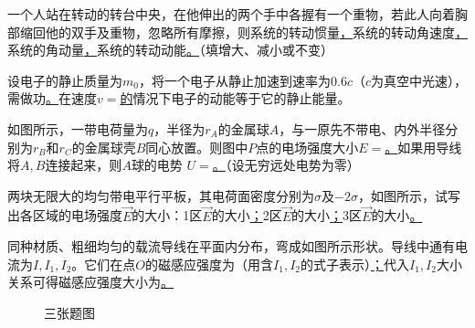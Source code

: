 一个人站在转动的转台中央，在他伸出的两个手中各握有一个重物，若此人向着胸部缩回他的双手及重物，忽略所有摩擦，则系统的转动惯量\ul，系统的转动角速度\ul，系统的角动量\ul ，系统的转动动能\ul。（填增大、减小或不变）

设电子的静止质量为$m_0$，将一个电子从静止加速到速率为$0.6c$（$c$为真空中光速），需做功\ul。在速度$v=$\ul 的情况下电子的动能等于它的静止能量。

如图所示，一带电荷量为$q$，半径为$r_A$的金属球$A$，与一原先不带电、内外半径分别为$r_B$和$r_C$的金属球壳$B$同心放置。则图中$P$点的电场强度大小$E=$\ul。如果用导线将$A,B$连接起来，则$A$球的电势 $U=$\ul。（设无穷远处电势为零）

两块无限大的均匀带电平行平板，其电荷面密度分别为$\sigma$及$-2\sigma$，如图所示，试写出各区域的电场强度$\vec{E}$的大小：1区$\vec{E}$的大小\ul；2区$\vec{E}$的大小\ul；3区$\vec{E}$的大小\ul。

同种材质、粗细均匀的载流导线在平面内分布，弯成如图所示形状。导线中通有电流为$I,I_1,I_2$。它们在点$O$的磁感应强度为（用含$I_1,I_2$的式子表示）\ul；代入$I_1,I_2$大小关系可得磁感应强度大小为\ul。

\begin{figure}[!h]
	\centering
	\quad
	\quad
	\caption{三张题图}
\end{figure}


